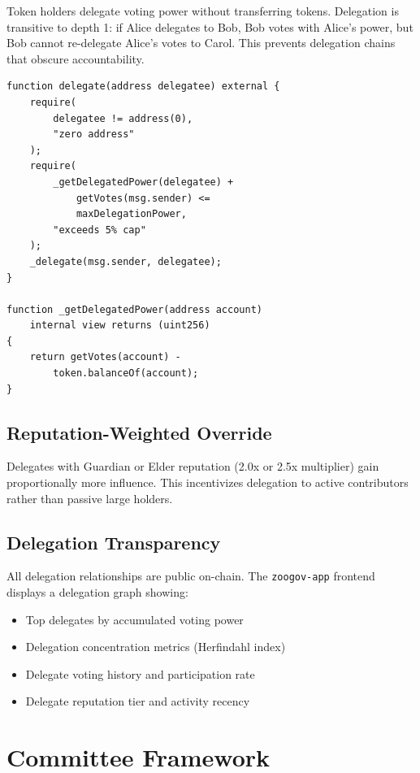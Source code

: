 \documentclass[11pt,letterpaper]{article}
\begin{document}
Token holders delegate voting power without transferring tokens. Delegation is transitive to depth 1: if Alice delegates to Bob, Bob votes with Alice's power, but Bob cannot re-delegate Alice's votes to Carol. This prevents delegation chains that obscure accountability.

\begin{lstlisting}[language=Solidity,caption=Delegation with depth limit]
function delegate(address delegatee) external {
    require(
        delegatee != address(0),
        "zero address"
    );
    require(
        _getDelegatedPower(delegatee) +
            getVotes(msg.sender) <=
            maxDelegationPower,
        "exceeds 5% cap"
    );
    _delegate(msg.sender, delegatee);
}

function _getDelegatedPower(address account)
    internal view returns (uint256)
{
    return getVotes(account) -
        token.balanceOf(account);
}
\end{lstlisting}

\subsection{Reputation-Weighted Override}

Delegates with Guardian or Elder reputation (2.0x or 2.5x multiplier) gain proportionally more influence. This incentivizes delegation to active contributors rather than passive large holders.

\subsection{Delegation Transparency}

All delegation relationships are public on-chain. The \texttt{zoogov-app} frontend displays a delegation graph showing:
\begin{itemize}
    \item Top delegates by accumulated voting power
    \item Delegation concentration metrics (Herfindahl index)
    \item Delegate voting history and participation rate
    \item Delegate reputation tier and activity recency
\end{itemize}

\section{Committee Framework}
\label{sec:committees}
\end{document}

